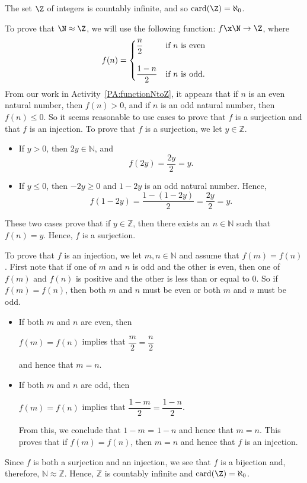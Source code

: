 \begin{theorem}\label{T:ZequivtoN}
The set $\Z$ of integers is countably infinite, and so 
$\text{card}( \Z ) = \aleph_0$.
\end{theorem}
%
\begin{myproof}
To prove that $\N \approx \Z$, we will use the following function:
$f\x \N \to \Z$, where
%
\begin{equation} \notag
f ( n ) = 
\begin{cases}
\dfrac{n}{2}         &\text{if $n$ is even} \\
                      &                      \\
\dfrac{1-n}{2}       &\text{if $n$ is odd}.
\end{cases}
\end{equation}
%
From our work in \typeu Activity~\ref*{PA:functionNtoZ}, it appears that if $n$ is an even natural number, then $f ( n ) > 0$, and if $n$ is an odd natural number, then 
$f ( n ) \leq 0$.  So it seems reasonable to use cases to prove that $f$ is a surjection and that $f$ is an injection.
To prove that $f$ is a surjection, we let $y \in \mathbb{Z}$.
\begin{itemize}
\item If $y > 0$, then $2y \in \mathbb{N}$, and
\[
f ( 2y ) = \frac{2y}{2} = y.
\]
\item If $y \leq 0$, then $-2y \geq 0$ and $1 - 2y$ is an odd natural number.  Hence,
\[
f ( 1 - 2y ) = \frac{1 - (1 - 2y )}{2} = \frac{2y}{2}=y.
\]
\end{itemize}
These two cases prove that if $y \in \mathbb{Z}$, then there exists an $n \in \mathbb{N}$ such that \linebreak
$f ( n ) = y$.  Hence, $f$ is a surjection.

\vskip6pt
To prove that $f$ is an injection, we let $m, n \in \mathbb{N}$ and assume that  
$f ( m ) = f ( n )$.  First note that if one of $m$ and $n$ is odd and the other is even, then one of $f ( m )$ and $f ( n )$ is positive and the other is less than or equal to 0.  So if $f ( m ) = f ( n )$, then both $m$ and $n$ must be even or both $m$ and $n$ must be odd.
\begin{itemize}
\item If both $m$ and $n$ are even, then
\begin{center}
$f ( m ) = f ( n )$ implies that $\dfrac{m}{2} = \dfrac{n}{2}$
\end{center}
and hence that $m = n$.

\item If both $m$ and $n$ are odd, then
\begin{center}
$f ( m ) = f ( n )$ implies that $\dfrac{1-m}{2} = \dfrac{1-n}{2}$.
\end{center}
From this, we conclude that $1 - m$ = $1 - n$ and hence that $m = n$.  This proves that if 
$f ( m ) = f ( n )$, then $m = n$ and hence that $f$ is an injection.
\end{itemize}

Since $f$ is both a surjection and an injection, we see that $f$ is a bijection and, therefore, 
$\mathbb{N} \approx \mathbb{Z}$.  Hence, $\mathbb{Z}$ is countably infinite and
$\text{card} ( \Z ) = \aleph_0$.
\end{myproof}

